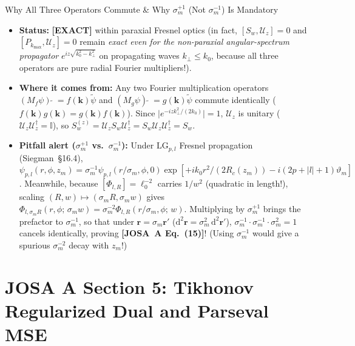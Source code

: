 \documentclass[10pt,letterpaper]{article}
\newcommand{\abs}[1]{\lvert #1 \rvert}
\newcommand{\dd}{\mathrm{d}}
\newcommand{\josa}[1]{\textbf{[JOSA~A Eq.~(#1)]}}
\newcommand{\tagexact}{\textcolor{forest}{\textbf{[EXACT]}}}
\numberwithin{equation}{section}
\begin{document}
\begin{approxbox}{Why All Three Operators Commute \& Why $\sigma_m^{+1}$ (Not $\sigma_m^{-1}$) Is Mandatory}
\begin{itemize}[leftmargin=1.4em,itemsep=2pt,topsep=1pt]
  \item \textbf{Status:} \tagexact{} within paraxial Fresnel optics (in fact, $[S_w, \mathcal{U}_z] = 0$ and $[P_{k_{\max}}, \mathcal{U}_z] = 0$ remain \emph{exact even for the non-paraxial angular-spectrum propagator} $e^{iz\sqrt{k_0^2 - k_\perp^2}}$ on propagating waves $k_\perp \le k_0$, because all three operators are pure radial Fourier multipliers!).
  \item \textbf{Where it comes from:} Any two Fourier multiplication operators $(M_f\psi)\,\widetilde{}\; = f(\mathbf{k})\widetilde{\psi}$ and $(M_g\psi)\,\widetilde{}\; = g(\mathbf{k})\widetilde{\psi}$ commute identically ($f(\mathbf{k})g(\mathbf{k}) = g(\mathbf{k})f(\mathbf{k})$). Since $\abs{e^{-iz k_\perp^2/(2k_0)}} = 1$, $\mathcal{U}_z$ is unitary ($\mathcal{U}_z\mathcal{U}_z^\dagger = \mathbb{I}$), so $S_w^{(z)} = \mathcal{U}_z S_w \mathcal{U}_z^\dagger = S_w \mathcal{U}_z \mathcal{U}_z^\dagger = S_w$.
  \item \textbf{Pitfall alert ($\sigma_m^{+1}$ vs.\ $\sigma_m^{-1}$):} Under $\mathrm{LG}_{p,l}$ Fresnel propagation (Siegman~\S16.4), $\psi_{p,l}(r,\phi,z_m) = \sigma_m^{-1}\psi_{p,l}(r/\sigma_m,\phi,0)\exp[+ik_0 r^2/(2R_c(z_m)) - i(2p+\abs{l}+1)\vartheta_m]$. Meanwhile, because $[\Phi_{l,R}] = \ell_0^{-2}$ carries $1/w^2$ (quadratic in length!), scaling $(R,w) \mapsto (\sigma_m R, \sigma_m w)$ gives $\Phi_{l,\sigma_m R}(r,\phi;\,\sigma_m w) = \sigma_m^{-2}\Phi_{l,R}(r/\sigma_m,\phi;\,w)$. Multiplying by $\sigma_m^{+1}$ brings the prefactor to $\sigma_m^{-1}$, so that under $\mathbf{r} = \sigma_m\mathbf{r}'$ ($\dd^2\mathbf{r} = \sigma_m^2\,\dd^2\mathbf{r}'$), $\sigma_m^{-1}\cdot\sigma_m^{-1}\cdot\sigma_m^2 = 1$ cancels identically, proving \josa{15}! (Using $\sigma_m^{-1}$ would give a spurious $\sigma_m^{-2}$ decay with $z_m$!)
\end{itemize}
\end{approxbox}

\section{JOSA A Section 5: Tikhonov Regularized Dual and Parseval MSE}
\label{sec:v2_s5}
\end{document}
